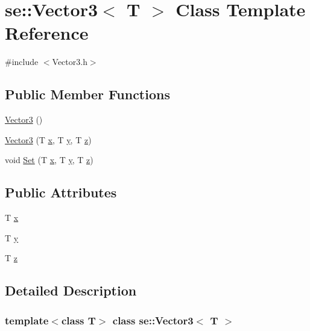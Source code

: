 \hypertarget{classse_1_1_vector3}{}\section{se\+:\+:Vector3$<$ T $>$ Class Template Reference}
\label{classse_1_1_vector3}


{\ttfamily \#include $<$Vector3.\+h$>$}

\subsection*{Public Member Functions}
\begin{DoxyCompactItemize}
\item 
\mbox{\hyperlink{classse_1_1_vector3_a9287277a349e2e99447b3eafe69bff5a}{Vector3}} ()
\item 
\mbox{\hyperlink{classse_1_1_vector3_a6d5f0d6aded9d084a39013c928515724}{Vector3}} (T \mbox{\hyperlink{classse_1_1_vector3_a1dd0e9af86e73921dd391b00dbfd8526}{x}}, T \mbox{\hyperlink{classse_1_1_vector3_a32fd129ef6071a9316612fa223e2ca1b}{y}}, T \mbox{\hyperlink{classse_1_1_vector3_ac38fc2b30fc8426e66746a6220b21a03}{z}})
\item 
void \mbox{\hyperlink{classse_1_1_vector3_a413a3535ea9c8a76ef2f4d8c782684b8}{Set}} (T \mbox{\hyperlink{classse_1_1_vector3_a1dd0e9af86e73921dd391b00dbfd8526}{x}}, T \mbox{\hyperlink{classse_1_1_vector3_a32fd129ef6071a9316612fa223e2ca1b}{y}}, T \mbox{\hyperlink{classse_1_1_vector3_ac38fc2b30fc8426e66746a6220b21a03}{z}})
\end{DoxyCompactItemize}
\subsection*{Public Attributes}
\begin{DoxyCompactItemize}
\item 
T \mbox{\hyperlink{classse_1_1_vector3_a1dd0e9af86e73921dd391b00dbfd8526}{x}}
\item 
T \mbox{\hyperlink{classse_1_1_vector3_a32fd129ef6071a9316612fa223e2ca1b}{y}}
\item 
T \mbox{\hyperlink{classse_1_1_vector3_ac38fc2b30fc8426e66746a6220b21a03}{z}}
\end{DoxyCompactItemize}


\subsection{Detailed Description}
\subsubsection*{template$<$class T$>$\newline
class se\+::\+Vector3$<$ T $>$}

